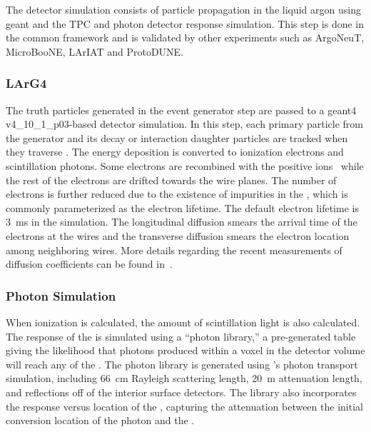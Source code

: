 The detector simulation consists of particle propagation in the liquid argon using {\sc geant} and the TPC and photon detector response simulation. This step is done in the common framework  and is validated by other  experiments such as ArgoNeuT, MicroBooNE, LArIAT and ProtoDUNE.

\subsubsection{LArG4}\label{sec:larg4}

The truth particles generated in the event generator step are passed to a {\sc geant4} v4\_10\_1\_p03-based detector simulation. In this step, each primary particle from the generator and its decay or interaction daughter particles are tracked when they traverse \lar. The energy deposition is converted to ionization electrons and scintillation photons. Some electrons are recombined with the positive ions~\cite{Acciarri:2013met,Amoruso:2004dy} while the rest of the electrons are drifted towards the wire planes. The number of electrons is further reduced due to the existence of impurities in the \lar, which is commonly parameterized as the electron lifetime. The default electron lifetime is \SI{3}{ms} in the simulation. The longitudinal diffusion smears the arrival time of the electrons at the wires and the transverse diffusion smears the electron location among neighboring wires. More details
regarding the recent measurements of diffusion coefficients can be found
in~\cite{Li:2015rqa,larpropertiesbnl}.

\subsubsection{Photon Simulation}

When ionization is calculated, the amount of scintillation light is also calculated. The response of the  is simulated using a ``photon library,'' a pre-generated table giving the likelihood that photons produced within a voxel in the detector volume  will reach any of the . The photon library is generated using 's photon transport simulation, including \SI{66}{cm} Rayleigh scattering length, \SI{20}{m} attenuation length, and reflections off of the interior surface detectors. The library also incorporates the response versus location of the , capturing the attenuation between the initial conversion location of the photon and the .

